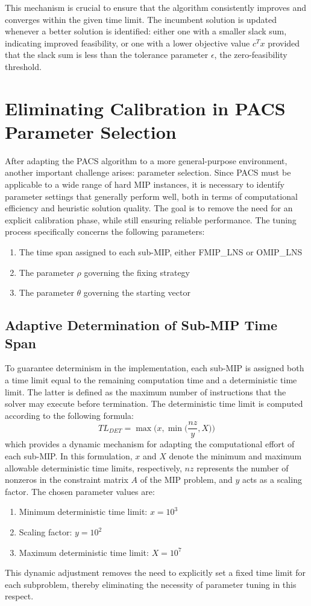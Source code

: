 This mechanism is crucial to ensure that the algorithm consistently improves and converges within the given time limit. The incumbent solution is updated whenever a better solution is identified: either one with a smaller slack sum, indicating improved feasibility, or one with a lower objective value $c^T x$ provided that the slack sum is less than the tolerance parameter $\epsilon$, the zero-feasibility threshold.

\section{Eliminating Calibration in PACS Parameter Selection}
After adapting the PACS algorithm to a more general-purpose environment, another important challenge arises: parameter selection. Since PACS must be applicable to a wide range of hard MIP instances, it is necessary to identify parameter settings that generally perform well, both in terms of computational efficiency and heuristic solution quality.  
The goal is to remove the need for an explicit calibration phase, while still ensuring reliable performance. The tuning process specifically concerns the following parameters:
\begin{enumerate}
    \item The time span assigned to each sub-MIP, either FMIP\_LNS or OMIP\_LNS
    \item The parameter $\rho$ governing the fixing strategy 
    \item The parameter $\theta$ governing the starting vector
\end{enumerate}

\subsection{Adaptive Determination of Sub-MIP Time Span}
To guarantee determinism in the implementation, each sub-MIP is assigned both a time limit equal to the remaining computation time and a deterministic time limit. The latter is defined as the maximum number of instructions that the solver may execute before termination.  
The deterministic time limit is computed according to the following formula:
\begin{equation}
TL_{DET} = \max\Big(x, \min\Big(\frac{nz}{y}, X\Big)\Big)
\end{equation}
which provides a dynamic mechanism for adapting the computational effort of each sub-MIP.  
In this formulation, $x$ and $X$ denote the minimum and maximum allowable deterministic time limits, respectively, $nz$ represents the number of nonzeros in the constraint matrix $A$ of the MIP problem, and $y$ acts as a scaling factor. The chosen parameter values are:
\begin{enumerate}
\item Minimum deterministic time limit: $x = 10^3$  
\item Scaling factor: $y = 10^2$  
\item Maximum deterministic time limit: $X = 10^7$  
\end{enumerate}
This dynamic adjustment removes the need to explicitly set a fixed time limit for each subproblem, thereby eliminating the necessity of parameter tuning in this respect.

